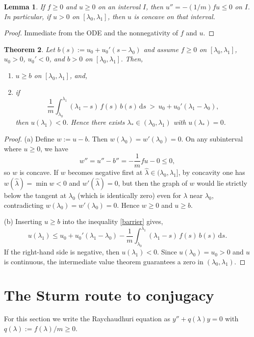 \documentclass[a4paper, reqno]{amsart}
\numberwithin{equation}{section}
\theoremstyle{plain}
\newtheorem{theorem}{Theorem}[section]
\newtheorem{lemma}[theorem]{Lemma}
\theoremstyle{definition}
\theoremstyle{remark}
\newcommand{\dd}{\mathrm{d}}
\newcommand{\lam}{\lambda}
\newcommand{\lamo}{\lambda_0}
\newcommand{\lamone}{\lambda_1}
\begin{document}
\begin{lemma}\label{lem:concavity}
If $f\ge 0$ and $u\ge 0$ on an interval $I$, then $u''=-(1/m)fu\le 0$ on $I$. In particular, if $u>0$ on $[\lamo,\lamone]$, then $u$ is concave on that interval.
\end{lemma}
\begin{proof}
Immediate from the ODE and the nonnegativity of $f$ and $u$.

\end{proof}

\begin{theorem}\label{thm:barrier}
Let $b(s):=u_0+u_0'(s-\lamo)$ and assume $f\ge 0$ on $[\lamo,\lamone]$, $u_0>0$, $u_0'<0$, and $b>0$ on $[\lamo,\lamone]$. Then,
\begin{enumerate}[label=\textup{(\alph*)}]
\item $u\ge b$ on $[\lamo,\lamone]$, and,
\item if
$$\frac{1}{m}\int_{\lamo}^{\lamone}(\lamone-s)\,f(s)\,b(s)\,\dd s\ >\ u_0+u_0'(\lamone-\lamo),$$
then $u(\lamone)<0$. Hence there exists $\lam_*\in(\lamo,\lamone)$ with $u(\lam_*)=0$.
\end{enumerate}
\end{theorem}
\begin{proof}
(a) Define $w:=u-b$. Then $w(\lamo)=w'(\lamo)=0$. On any subinterval where $u\ge 0$, we have
$$w''=u''-b''=-\frac{1}{m}f u - 0 \le 0,$$
so $w$ is concave. If $w$ becomes negative first at $\hat\lam\in(\lamo,\lamone]$, by concavity one has $w(\hat\lam)=\min w<0$ and $w'(\hat\lam)=0$, but then the graph of $w$ would lie strictly below the tangent at $\lamo$ (which is identically zero) even for $\lam$ near $\lamo$, contradicting $w(\lamo)=w'(\lamo)=0$. Hence $w\ge 0$ and $u\ge b$.

(b) Inserting $u\ge b$ into the inequality \ref{barrier} gives,
$$u(\lamone)\le u_0+u_0'(\lamone-\lamo)-\frac{1}{m}\int_{\lamo}^{\lamone}(\lamone-s)\,f(s)\,b(s)\,\dd s.$$
If the right-hand side is negative, then $u(\lamone)<0$. Since $u(\lamo)=u_0>0$ and $u$ is continuous, the intermediate value theorem guarantees a zero in $(\lamo,\lamone)$.

\end{proof}

\section{The Sturm route to conjugacy}\label{sec:sturm}

For this section we write the Raychaudhuri equation as $y''+q(\lam)y=0$ with $q(\lam):=f(\lam)/m\ge 0.$
\end{document}
